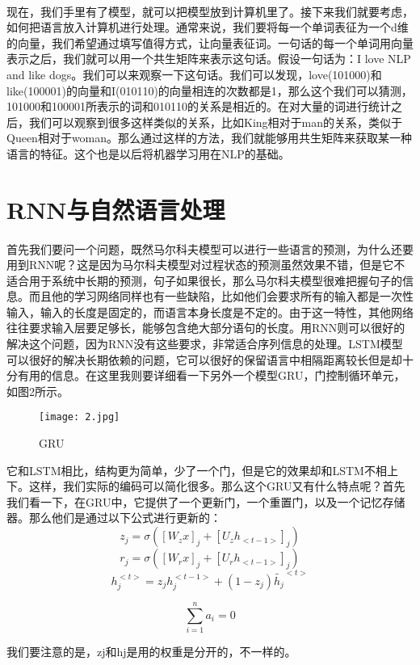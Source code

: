 \documentclass[UTF8]{ctexart}
\begin{document}
			\paragraph{}
			现在，我们手里有了模型，就可以把模型放到计算机里了。接下来我们就要考虑，如何把语言放入计算机进行处理。通常来说，我们要将每一个单词表征为一个d维的向量，我们希望通过填写值得方式，让向量表征词。一句话的每一个单词用向量表示之后，我们就可以用一个共生矩阵来表示这句话。假设一句话为：I love NLP and like dogs。我们可以来观察一下这句话。我们可以发现，love(101000)和like(100001)的向量和I(010110)的向量相连的次数都是1，那么这个我们可以猜测，101000和100001所表示的词和010110的关系是相近的。在对大量的词进行统计之后，我们可以观察到很多这样类似的关系，比如King相对于man的关系，类似于Queen相对于woman。那么通过这样的方法，我们就能够用共生矩阵来获取某一种语言的特征。这个也是以后将机器学习用在NLP的基础。
		\section{RNN与自然语言处理}
			\paragraph{}
			首先我们要问一个问题，既然马尔科夫模型可以进行一些语言的预测，为什么还要用到RNN呢？这是因为马尔科夫模型对过程状态的预测虽然效果不错，但是它不适合用于系统中长期的预测，句子如果很长，那么马尔科夫模型很难把握句子的信息。而且他的学习网络同样也有一些缺陷，比如他们会要求所有的输入都是一次性输入，输入的长度是固定的，而语言本身长度是不定的。由于这一特性，其他网络往往要求输入层要足够长，能够包含绝大部分语句的长度。用RNN则可以很好的解决这个问题，因为RNN没有这些要求，非常适合序列信息的处理。LSTM模型可以很好的解决长期依赖的问题，它可以很好的保留语言中相隔距离较长但是却十分有用的信息。在这里我则要详细看一下另外一个模型GRU，门控制循环单元，如图2所示。
\begin{figure}
\centering
\texttt{[image: 2.jpg]}
\caption{GRU}
\label{fig:test}
\end{figure}
它和LSTM相比，结构更为简单，少了一个门，但是它的效果却和LSTM不相上下。这样，我们实际的编码可以简化很多。那么这个GRU又有什么特点呢？首先我们看一下，在GRU中，它提供了一个更新门，一个重置门，以及一个记忆存储器。那么他们是通过以下公式进行更新的：
$$z_j=\sigma([W_z x]_j+[U_z h_{<t-1>}]_j) $$
$$r_j=\sigma([W_r x]_j+[U_r h_{<t-1>}]_j) $$
$$h_j^{<t>}=z_j h_j^{<t-1>}+(1-z_j)\widetilde{h_j}^{<t>}$$


$$\sum_{i=1}^n a_i=0$$

我们要注意的是，zj和hj是用的权重是分开的，不一样的。
\end{document}
